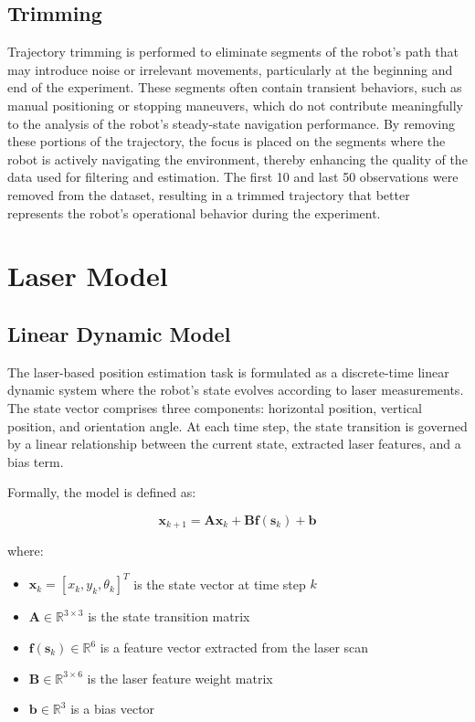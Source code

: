 \documentclass[conference]{IEEEtran}
\begin{document}
\subsection{Trimming} \label{sec:trimming}

Trajectory trimming is performed to eliminate segments of the robot's path that may introduce noise or irrelevant movements, particularly at the beginning and end of the experiment. These segments often contain transient behaviors, such as manual positioning or stopping maneuvers, which do not contribute meaningfully to the analysis of the robot's steady-state navigation performance. By removing these portions of the trajectory, the focus is placed on the segments where the robot is actively navigating the environment, thereby enhancing the quality of the data used for filtering and estimation. The first 10 and last 50 observations were removed from the dataset, resulting in a trimmed trajectory that better represents the robot's operational behavior during the experiment.

\section{Laser Model} \label{sec:laser_model}

\subsection{Linear Dynamic Model} \label{sec:laser_model_linear}

The laser-based position estimation task is formulated as a discrete-time linear dynamic system where the robot's state evolves according to laser measurements. The state vector comprises three components: horizontal position, vertical position, and orientation angle. At each time step, the state transition is governed by a linear relationship between the current state, extracted laser features, and a bias term.

Formally, the model is defined as:

\begin{equation}
    \mathbf{x}_{k+1} = \mathbf{A} \mathbf{x}_k + \mathbf{B} \mathbf{f}(\mathbf{s}_k) + \mathbf{b}
\end{equation}

where:
\begin{itemize}
    \item $\mathbf{x}_k = [x_k, y_k, \theta_k]^T$ is the state vector at time step $k$
    \item $\mathbf{A} \in \mathbb{R}^{3 \times 3}$ is the state transition matrix
    \item $\mathbf{f}(\mathbf{s}_k) \in \mathbb{R}^6$ is a feature vector extracted from the laser scan
    \item $\mathbf{B} \in \mathbb{R}^{3 \times 6}$ is the laser feature weight matrix
    \item $\mathbf{b} \in \mathbb{R}^3$ is a bias vector
\end{itemize}
\end{document}
